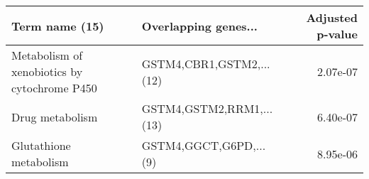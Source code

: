 \begin{tabular}{llr}
\toprule
                              Term name (15) &     Overlapping genes... &  Adjusted p-value \\
\midrule
Metabolism of xenobiotics by cytochrome P450 & GSTM4,CBR1,GSTM2,...(12) &          2.07e-07 \\
                             Drug metabolism & GSTM4,GSTM2,RRM1,...(13) &          6.40e-07 \\
                      Glutathione metabolism &   GSTM4,GGCT,G6PD,...(9) &          8.95e-06 \\
\bottomrule
\end{tabular}
